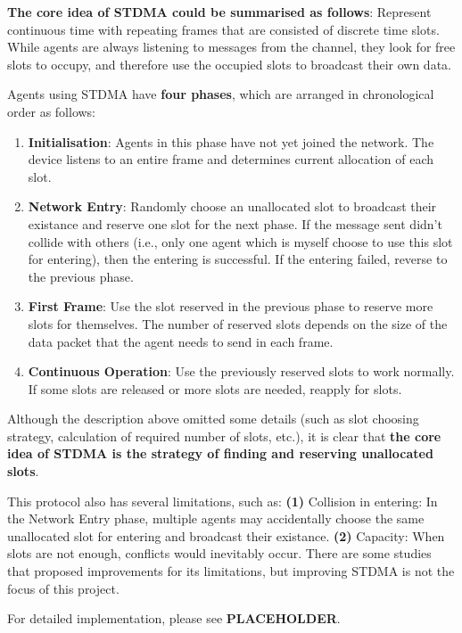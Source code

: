 \textbf{The core idea of STDMA could be summarised as follows}: Represent continuous time with repeating frames that are consisted of discrete time slots.
While agents are always listening to messages from the channel, they look for free slots to occupy, and therefore use the occupied slots to broadcast their own data.

Agents using STDMA have \textbf{four phases}, which are arranged in chronological order as follows:

\begin{enumerate}
  \item \textbf{Initialisation}: Agents in this phase have not yet joined the network. The device listens to an entire frame and determines current allocation of each slot.
  \item \textbf{Network Entry}: Randomly choose an unallocated slot to broadcast their existance and reserve one slot for the next phase.  If the message sent didn't collide with others (i.e., only one agent which is myself choose to use this slot for entering), then the entering is successful. If the entering failed, reverse to the previous phase.
  \item \textbf{First Frame}: Use the slot reserved in the previous phase to reserve more slots for themselves. The number of reserved slots depends on the size of the data packet that the agent needs to send in each frame.
  \item \textbf{Continuous Operation}: Use the previously reserved slots to work normally. If some slots are released or more slots are needed, reapply for slots.
\end{enumerate}

Although the description above omitted some details (such as slot choosing strategy, calculation of required number of slots, etc.), it is clear that \textbf{the core idea of STDMA is the strategy of finding and reserving unallocated slots}.

This protocol also has several limitations, such as: \textbf{(1)} Collision in entering: In the Network Entry phase, multiple agents may accidentally choose the same unallocated slot for entering and broadcast their existance. \textbf{(2)} Capacity: When slots are not enough, conflicts would inevitably occur. 
There are some studies \cite{STDMA_improv1,STDMA_improv2} that proposed improvements for its limitations, but improving STDMA is not the focus of this project.

For detailed implementation, please see \textbf{PLACEHOLDER}.

